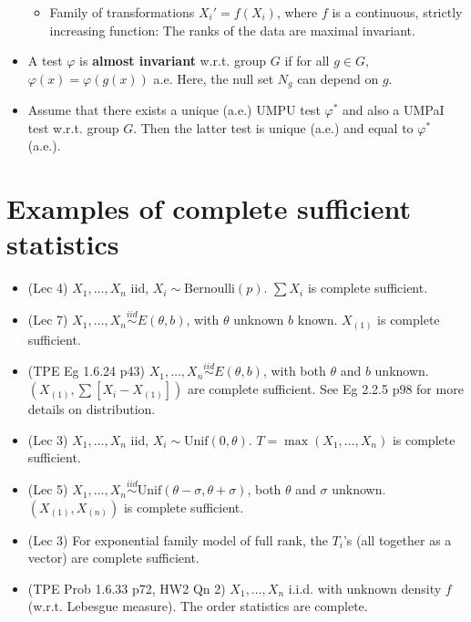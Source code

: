 \documentclass[twoside]{article}
\newcommand\sg{\sigma}
\def\t{\theta}
\begin{document}
\begin{itemize}
\begin{itemize}
\item Family of transformations $X_i' = f(X_i)$, where $f$ is a continuous, strictly increasing function: The ranks of the data are maximal invariant.
\end{itemize}

\item A test $\varphi$ is \textbf{almost invariant} w.r.t. group $G$ if for all $g \in G$, 
$\varphi(x) = \varphi(g(x))$ a.e. Here, the null set $N_g$ can depend on $g$.

\item Assume that there exists a unique (a.e.) UMPU test $\varphi^*$ and also a UMPaI test w.r.t. group $G$. Then the latter test is unique (a.e.) and equal to $\varphi^*$ (a.e.).

\end{itemize}

\section*{Examples of complete sufficient statistics}
\begin{itemize}
\item (Lec 4) $X_1, \dots, X_n$ iid, $X_i \sim \text{Bernoulli}(p)$. $\sum X_i$ is complete sufficient.

\item (Lec 7) $X_1, \dots, X_n \stackrel{iid}{\sim} E(\t,b)$, with $\t$ unknown $b$ known. $X_{(1)}$ is complete sufficient.

\item (TPE Eg 1.6.24 p43) $X_1, \dots, X_n \stackrel{iid}{\sim} E(\t,b)$, with both $\t$ and $b$ unknown. $\left(X_{(1)}, \sum [X_i - X_{(1)}] \right)$ are complete sufficient. See Eg 2.2.5 p98 for more details on distribution.

\item (Lec 3) $X_1, \dots, X_n$ iid, $X_i \sim \text{Unif}(0, \t)$. $T = \max (X_1, \dots, X_n)$ is complete sufficient.
\item (Lec 5) $X_1, \dots, X_n \stackrel{iid}{\sim} \text{Unif}(\t - \sg, \t + \sg)$, both $\t$ and $\sg$ unknown. $(X_{(1)}, X_{(n)})$ is complete sufficient.
\item (Lec 3) For exponential family model of full rank, the $T_i$'s (all together as a vector) are complete sufficient.

\item (TPE Prob 1.6.33 p72, HW2 Qn 2) $X_1, \dots, X_n$ i.i.d. with unknown density $f$ (w.r.t. Lebesgue measure). The order statistics are complete.
\end{itemize}
\end{document}
